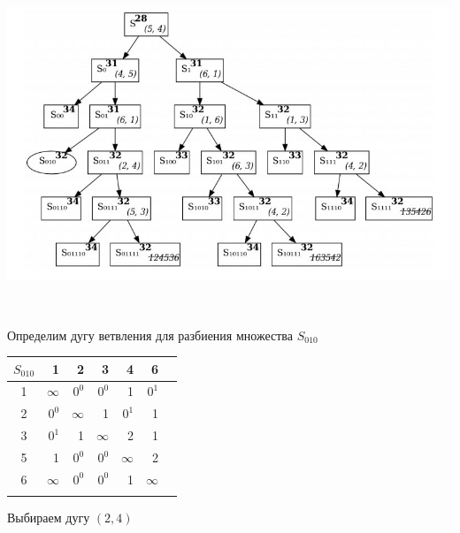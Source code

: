 \documentclass[12pt]{article}
\begin{document}
\begin{flushleft}
 
\includegraphics[width = 15cm, height = 10cm]{pictures/picture_04.jpg}\\
\end{flushleft}
\vspace{3cm}
\begin{flushleft}
 
Определим дугу ветвления для разбиения множества $S_{010}$\\
\end{flushleft}

\begin{flushleft}
 \begin{tabular}{c||rrrrr||c}
$S_{010}$ & 1 &2 & 3 & 4 & 6 & \\
\hline
\hline
1 & $\infty$ & $0^0$ & $0^0$ & 1  & $0^1$ & \\
2 & $0^0$ & $\infty$ & 1 & $0^1$  & 1 & \\
3 & $0^1$ & 1 & $\infty$ & 2  & 1 & \\
5 & 1 & $0^0$ & $0^0$ & $\infty$  & 2 \\
6 & $\infty$ & $0^0$ & $0^0$ & 1 & $\infty$ & \\
\hline
\hline
 & &   &  &  &  & \\
\end{tabular}
\end{flushleft}

Выбираем дугу $(2,4)$
\end{document}
